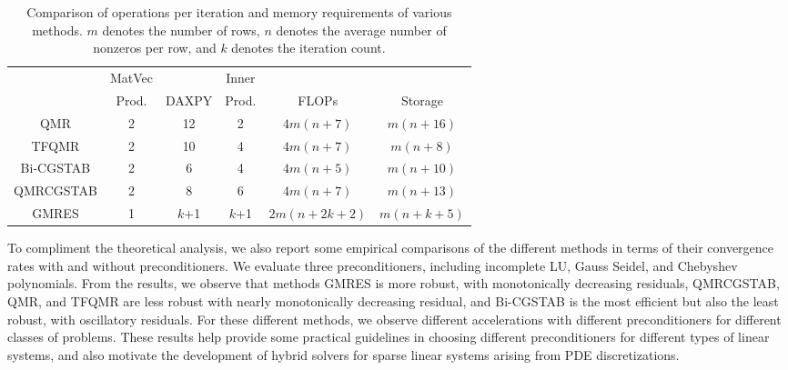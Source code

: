 \documentclass{report}
\begin{document}
\begin{table}
\caption{\label{tab:Comparison-of-operations}Comparison of operations per
iteration and memory requirements of various methods. $m$ denotes
the number of rows, $n$ denotes the average number of nonzeros per
row, and $k$ denotes the iteration count.}


\centering{}%
\begin{tabular}{c|c|c|c|c|c}
\hline
& MatVec & & Inner & & \tabularnewline
& Prod. & DAXPY & Prod. & FLOPs & Storage\tabularnewline
\hline
\hline
QMR & 2 & 12 & 2 & $4m(n+7)$ & $m(n+16)$\tabularnewline
\hline
TFQMR & 2 & 10 & 4 & $4m(n+7)$ & $m(n+8)$\tabularnewline
\hline
Bi-CGSTAB & 2 & 6 & 4 & $4m(n+5)$ & $m(n+10)$\tabularnewline
\hline
QMRCGSTAB & 2 & 8 & 6 & $4m(n+7)$ & $m(n+13)$\tabularnewline
\hline
GMRES & 1 & $k$+1 & $k$+1 & $2m(n+2k+2)$ & $m(n+k+5)$\tabularnewline
\hline
\end{tabular}
\end{table}


To compliment the theoretical analysis, we also report some empirical
comparisons of the different methods in terms of their convergence
rates with and without preconditioners. We evaluate three preconditioners,
including incomplete LU, Gauss Seidel, and Chebyshev polynomials.
From the results, we observe that methods GMRES is more robust, with
monotonically decreasing residuals, QMRCGSTAB, QMR, and TFQMR are
less robust with nearly monotonically decreasing residual, and Bi-CGSTAB
is the most efficient but also the least robust, with oscillatory
residuals. For these different methods, we observe different accelerations
with different preconditioners for different classes of problems.
These results help provide some practical guidelines in choosing different
preconditioners for different types of linear systems, and also motivate
the development of hybrid solvers for sparse linear systems arising
from PDE discretizations.
\end{document}
